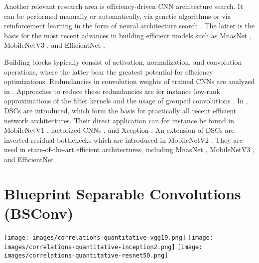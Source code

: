 \documentclass[10pt,twocolumn,letterpaper]{article}
\newcommand{\DCCK}{BSConv\xspace}
\begin{document}
Another relevant research area is efficiency-driven CNN architecture search.
It can be performed manually \cite{he2015convolutional} or automatically, \eg via genetic algorithms \cite{xie2017genetic} or via reinforcement learning in the form of neural architecture search \cite{zoph2016neural,cai2018proxylessnas}.
The latter is the basis for the most recent advances in building efficient models such as MnasNet \cite{tan2019mnasnet}, MobileNetV3 \cite{howard2019searching}, and EfficientNet \cite{tan2019efficientnet}.

Building blocks typically consist of activation, normalization, and convolution operations, where the latter bear the greatest potential for efficiency optimizations.
Redundancies in convolution weights of trained CNNs are analyzed in \cite{denil2013predicting,sifre2014rigid,shang2016understanding,guo2018network}.
Approaches to reduce these redundancies are for instance low-rank approximations of the filter kernels \cite{denton2014exploiting,jaderberg2014speeding,jin2014flattened} and the usage of grouped convolutions \cite{zhang2018shufflenet,ma2018shufflenet,xie2017aggregated}.
In \cite{sifre2014rigid}, DSCs are introduced, which form the basis for practically all recent efficient network architectures.
Their direct application can for instance be found in MobileNetV1 \cite{howard2017mobilenets}, factorized CNNs \cite{wang2017factorized}, and Xception \cite{chollet2017xception}.
An extension of DSCs are inverted residual bottlenecks which are introduced in MobileNetV2 \cite{sandler2018mobilenetv2}.
They are used in state-of-the-art efficient architectures, including MnasNet \cite{tan2019mnasnet}, MobileNetV3 
\cite{howard2019searching}, and EfficientNet \cite{tan2019efficientnet}.



\section{Blueprint Separable Convolutions (\DCCK)}
\label{sec:dcckOverarching}
\begin{figure*}
	\center
	\texttt{[image: images/correlations-quantitative-vgg19.png]}
	\texttt{[image: images/correlations-quantitative-inception2.png]}
	\texttt{[image: images/correlations-quantitative-resnet50.png]}
	\caption{Histogram of the variance along the depth axis of filter kernels which can be explained using only one principal component per filter.
		The filters are grouped by convolution stages (stage 1: blue, stage 2: orange, stage 3: green, stage 4: red).
		These quantitative results show that a large portion of CNN filters can potentially be represented using our \DCCK formulation.
		This figure is best viewed in color.
	}
     \label{fig:correlationsQuantitative}
\end{figure*}
\end{document}

